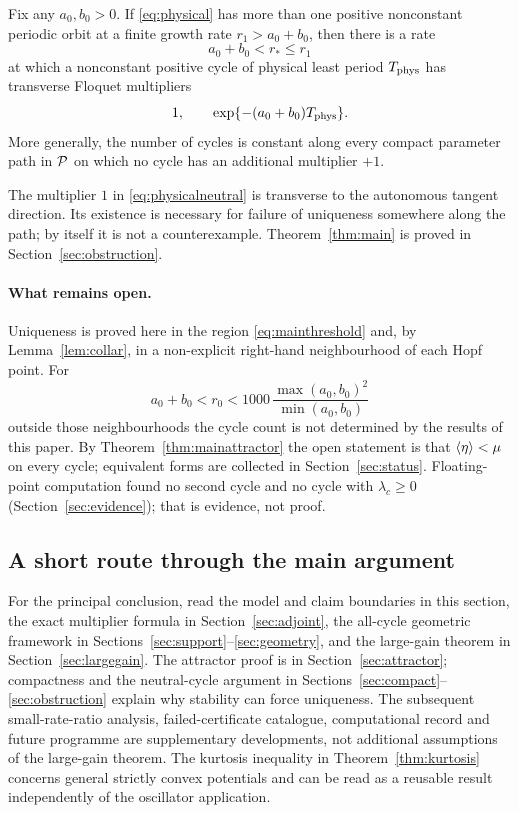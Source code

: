 \begin{theorem}\label{thm:main}
Fix any $a_0,b_0>0$. If \eqref{eq:physical} has more than one positive nonconstant periodic orbit at a finite growth rate $r_1>a_0+b_0$, then there is a rate
\[
a_0+b_0<r_*\le r_1
\]
at which a nonconstant positive cycle of physical least period $T_{\rm phys}$ has transverse Floquet multipliers
\begin{equation}\label{eq:physicalneutral}
1,\qquad \exp\{-(a_0+b_0)T_{\rm phys}\}.
\end{equation}
More generally, the number of cycles is constant along every compact parameter path in $\mathcal P$ on which no cycle has an additional multiplier $+1$.
\end{theorem}
The multiplier $1$ in \eqref{eq:physicalneutral} is transverse to the autonomous tangent direction. Its existence is necessary for failure of uniqueness somewhere along the path; by itself it is not a counterexample. Theorem~\ref{thm:main} is proved in Section~\ref{sec:obstruction}.

\paragraph{What remains open.} Uniqueness is proved here in the region \eqref{eq:mainthreshold} and, by Lemma~\ref{lem:collar}, in a non-explicit right-hand neighbourhood of each Hopf point. For
\[
a_0+b_0<r_0<1000\,\frac{\max(a_0,b_0)^2}{\min(a_0,b_0)}
\]
outside those neighbourhoods the cycle count is not determined by the results of this paper. By Theorem~\ref{thm:mainattractor} the open statement is that $\left\langle \eta\right\rangle<\mu$ on every cycle; equivalent forms are collected in Section~\ref{sec:status}. Floating-point computation found no second cycle and no cycle with $\lambda_c\ge0$ (Section~\ref{sec:evidence}); that is evidence, not proof.

\subsection{A short route through the main argument}
For the principal conclusion, read the model and claim boundaries in this section,
the exact multiplier formula in Section~\ref{sec:adjoint}, the all-cycle geometric
framework in Sections~\ref{sec:support}--\ref{sec:geometry}, and the large-gain
theorem in Section~\ref{sec:largegain}. The attractor proof is in
Section~\ref{sec:attractor}; compactness and the neutral-cycle argument in
Sections~\ref{sec:compact}--\ref{sec:obstruction} explain why stability can force
uniqueness. The subsequent small-rate-ratio analysis, failed-certificate catalogue,
computational record and future programme are supplementary developments, not
additional assumptions of the large-gain theorem. The kurtosis inequality in
Theorem~\ref{thm:kurtosis} concerns general strictly convex potentials and can be
read as a reusable result independently of the oscillator application.

